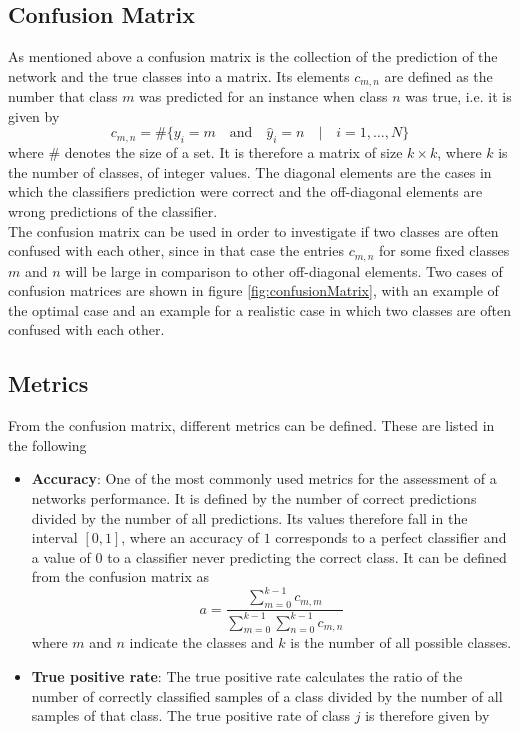 \subsection{Confusion Matrix}

As mentioned above a confusion matrix is the collection of the prediction of the network and the true classes into a matrix. Its elements $c_{m,n}$ are defined as the number that class $m$ was predicted for an instance when class $n$ was true, i.e. it is given by
\begin{equation}
c_{m,n} = \# \{y_i = m \quad \textrm{and} \quad \hat{y}_i = n \quad | \quad i=1,\dots,N  \}
\end{equation}
where $\#$ denotes the size of a set. It is therefore a matrix of size $k\times k$, where $k$ is the number of classes, of integer values. The diagonal elements are the cases in which the classifiers prediction were correct and the off-diagonal elements are wrong predictions of the classifier. \\

The confusion matrix can be used in order to investigate if two classes are often confused with each other, since in that case the entries $c_{m,n}$ for some fixed classes $m$ and $n$ will be large in comparison to other off-diagonal elements. Two cases of confusion matrices are shown in figure \ref{fig:confusionMatrix}, with an example of the optimal case and an example for a realistic case in which two classes are often confused with each other. \\

\subsection{Metrics}

From the confusion matrix, different metrics can be defined. These are listed in the following
\begin{itemize}[label={}]
\item \textbf{Accuracy}: One of the most commonly used metrics for the assessment of a networks performance. It is defined by the number of correct predictions divided by the number of all predictions. Its values therefore fall in the interval $[0,1]$, where an accuracy of $1$ corresponds to a perfect classifier and a value of $0$ to a classifier never predicting the correct class. It can be defined from the confusion matrix as 
\begin{equation}
a = \frac{\sum_{m=0}^{k-1} c_{m,m}}{\sum_{m=0}^{k-1} \sum_{n=0}^{k-1} c_{m,n}}
\end{equation} 
where $m$ and $n$ indicate the classes and $k$ is the number of all possible classes.
\item \textbf{True positive rate}: The true positive rate calculates the ratio of the number of correctly classified samples of a class divided by the number of all samples of that class. The true positive rate of class $j$ is therefore given by
\begin{equation}

\end{equation}
\end{itemize}



